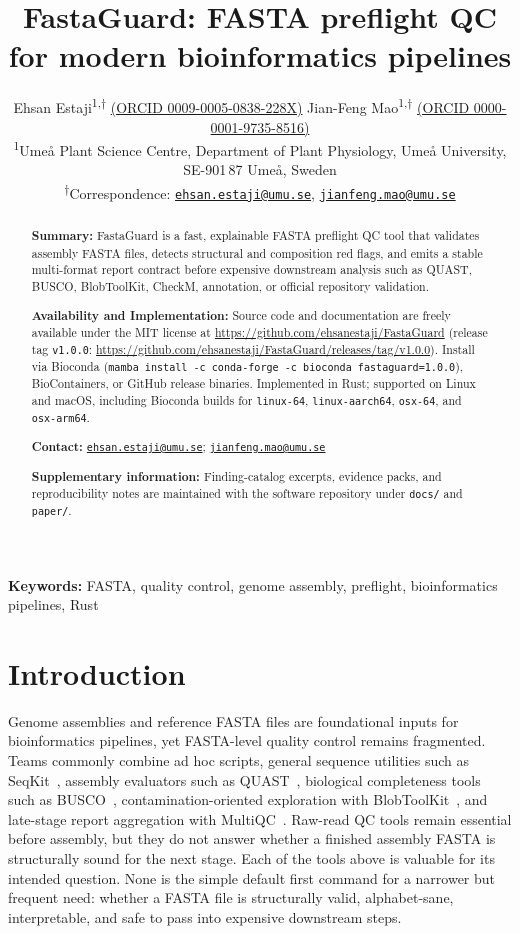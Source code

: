 \documentclass[11pt,a4paper]{article}
\title{FastaGuard: FASTA preflight QC for modern bioinformatics pipelines}
\author{
Ehsan Estaji\textsuperscript{1,$\dag$}
\href{https://orcid.org/0009-0005-0838-228X}{\small(ORCID 0009-0005-0838-228X)} \qquad
Jian-Feng Mao\textsuperscript{1,$\dag$}
\href{https://orcid.org/0000-0001-9735-8516}{\small(ORCID 0000-0001-9735-8516)} \\[6pt]
\small \textsuperscript{1}Ume{\aa} Plant Science Centre,
Department of Plant Physiology, Ume{\aa} University,
SE-901\,87 Ume{\aa}, Sweden \\[4pt]
\small \textsuperscript{$\dag$}Correspondence:
       \href{mailto:ehsan.estaji@umu.se}{\texttt{ehsan.estaji@umu.se}},
       \href{mailto:jianfeng.mao@umu.se}{\texttt{jianfeng.mao@umu.se}}
}
\date{}
\begin{document}
\linenumbers
\maketitle

\begin{abstract}
\noindent\textbf{Summary:}
FastaGuard is a fast, explainable FASTA preflight QC tool that validates assembly
FASTA files, detects structural and composition red flags, and emits a stable
multi-format report contract before expensive downstream analysis such as QUAST,
BUSCO, BlobToolKit, CheckM, annotation, or official repository validation.

\noindent\textbf{Availability and Implementation:}
Source code and documentation are freely available under the MIT license at
\url{https://github.com/ehsanestaji/FastaGuard}
(release tag \texttt{v1.0.0}:
\url{https://github.com/ehsanestaji/FastaGuard/releases/tag/v1.0.0}).
Install via Bioconda
(\texttt{mamba install -c conda-forge -c bioconda fastaguard=1.0.0}),
BioContainers, or GitHub release binaries.
Implemented in Rust; supported on Linux and macOS, including Bioconda builds for
\texttt{linux-64}, \texttt{linux-aarch64}, \texttt{osx-64}, and \texttt{osx-arm64}.

\noindent\textbf{Contact:}
\href{mailto:ehsan.estaji@umu.se}{\texttt{ehsan.estaji@umu.se}};
\href{mailto:jianfeng.mao@umu.se}{\texttt{jianfeng.mao@umu.se}}

\noindent\textbf{Supplementary information:}
Finding-catalog excerpts, evidence packs, and reproducibility notes are maintained
with the software repository under \texttt{docs/} and \texttt{paper/}.
\end{abstract}

\vspace{0.4em}
\noindent\textbf{Keywords:} FASTA, quality control, genome assembly, preflight,
bioinformatics pipelines, Rust

\section{Introduction}
Genome assemblies and reference FASTA files are foundational inputs for
bioinformatics pipelines, yet FASTA-level quality control remains fragmented.
Teams commonly combine ad hoc scripts, general sequence utilities such as
SeqKit~\citep{shen2016seqkit}, assembly evaluators such as
QUAST~\citep{gurevich2013quast}, biological completeness tools such as
BUSCO~\citep{simao2015busco}, contamination-oriented exploration with
BlobToolKit~\citep{challis2020blobtoolkit}, and late-stage report aggregation with
MultiQC~\citep{ewels2016multiqc}.
Raw-read QC tools remain essential before assembly, but they do not answer
whether a finished assembly FASTA is structurally sound for the next stage.
Each of the tools above is valuable for its intended question.
None is the simple default first command for a narrower but frequent need:
whether a FASTA file is structurally valid, alphabet-sane, interpretable, and
safe to pass into expensive downstream steps.
\end{document}
